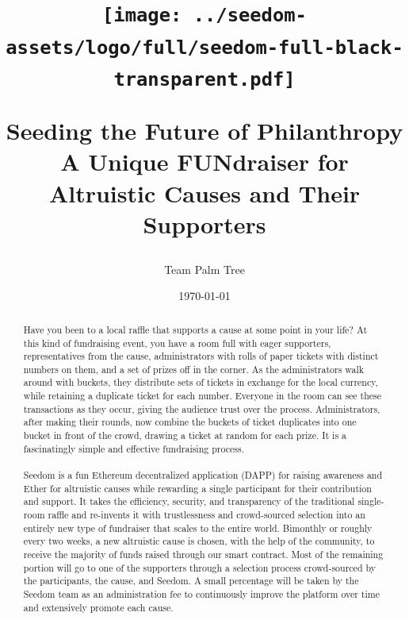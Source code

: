 \documentclass[11pt]{article}
\begin{document}
\title{%
\begin{center}
\texttt{[image: ../seedom-assets/logo/full/seedom-full-black-transparent.pdf]}
\end{center}
\large Seeding the Future of Philanthropy \\[5mm]
\large A Unique FUNdraiser for Altruistic Causes and Their Supporters \\[5mm]}
\author{Team Palm Tree}
\date{\today}
\maketitle

\begin{abstract}

Have you been to a local raffle that supports a cause at some point in your life? At this kind of fundraising event, you have a room full with eager supporters, representatives from the cause, administrators with rolls of paper tickets with distinct numbers on them, and a set of prizes off in the corner. As the administrators walk around with buckets, they distribute sets of tickets in exchange for the local currency, while retaining a duplicate ticket for each number. Everyone in the room can see these transactions as they occur, giving the audience trust over the process. Administrators, after making their rounds, now combine the buckets of ticket duplicates into one bucket in front of the crowd, drawing a ticket at random for each prize. It is a fascinatingly simple and effective fundraising process.\\\\
Seedom is a fun Ethereum decentralized application (DAPP) for raising awareness and Ether for altruistic causes while rewarding a single participant for their contribution and support. It takes the efficiency, security, and transparency of the traditional single-room raffle and re-invents it with trustlessness and crowd-sourced selection into an entirely new type of fundraiser that scales to the entire world. Bimonthly or roughly every two weeks, a new altruistic cause is chosen, with the help of the community, to receive the majority of funds raised through our smart contract. Most of the remaining portion will go to one of the supporters through a selection process crowd-sourced by the participants, the cause, and Seedom. A small percentage will be taken by the Seedom team as an administration fee to continuously improve the platform over time and extensively promote each cause.

\end{abstract}
\pagebreak
\end{document}
